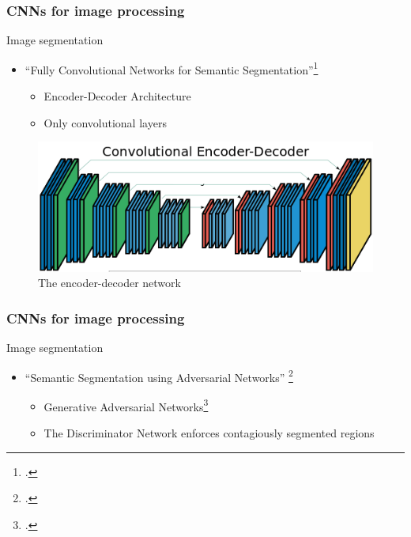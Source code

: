 \documentclass[18pt]{beamer}
\begin{document}
\begin{frame}
  \frametitle{CNNs for image processing}
  Image segmentation
  \begin{itemize}
  \item ``Fully Convolutional Networks for Semantic Segmentation''\footcite{long2014}
    \begin{itemize}
    \item Encoder-Decoder Architecture
    \item Only convolutional layers
    \end{itemize}
  \end{itemize}
  \vspace{0.5cm}
  \begin{center}
    \begin{figure}[htb]
      \includegraphics[scale=0.35]{images/auto_enc}
      \caption{The encoder-decoder network}
    \end{figure}
  \end{center}
\end{frame}


\begin{frame}
  \frametitle{CNNs for image processing}

  Image segmentation
  \begin{itemize}
  \item ``Semantic Segmentation using Adversarial Networks'' \footcite{luc2016}
    \begin{itemize}
    \item Generative Adversarial Networks\footcite{goodfellow2014}
    \item The Discriminator Network enforces contagiously segmented regions
    \end{itemize}
  \end{itemize}
\end{frame}
\end{document}
